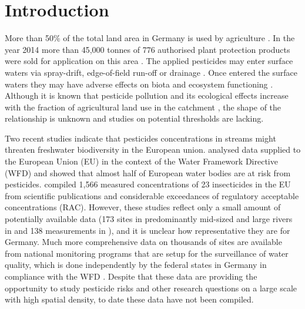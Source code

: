 \documentclass[journal=esthag,manuscript=article]{achemso}
\begin{document}



\section{Introduction}
More than 50\% of the total land area in Germany is used by agriculture \citep{statistisches_bundesamt_bodenflache_2014}.
In the year 2014 more than 45,000 tonnes of 776 authorised plant protection products were sold for application on this area \citep{bundesamt_fur_verbraucherschutz_und_lebensmittelsicherheit_absatz_2015}.
The applied pesticides may enter surface waters via spray-drift, edge-of-field run-off or drainage \citep{stehle_probabilistic_2013,schulz_comparison_2001,liess_determination_1999}.
Once entered the surface waters they may have adverse effects on biota and ecosystem functioning \citep{schafer_thresholds_2012}. 
Although it is known that pesticide pollution and its ecological effects increase with the fraction of agricultural land use in the catchment \citep{schulz_field_2004}, the shape of the relationship is unknown and studies on potential thresholds are lacking.

Two recent studies indicate that pesticides concentrations in streams might threaten freshwater biodiversity in the European union.
\citet{malaj_organic_2014} analysed data supplied to the European Union (EU) in the context of the Water Framework Directive (WFD) and showed that almost half of European water bodies are at risk from pesticides.
\citet{stehle_pesticide_2015} compiled 1,566 measured concentrations of 23 insecticides in the EU from scientific publications and considerable exceedances of regulatory acceptable concentrations (RAC).
However, these studies reflect only a small amount of potentially available data (173 sites in predominantly mid-sized and large rivers in \citet{malaj_organic_2014} and 138 measurements in \citet{stehle_pesticide_2015}), and it is unclear how representative they are for Germany. %
Much more comprehensive data on thousands of sites are available from national monitoring programs that are setup for the surveillance of water quality,
which is done independently by the federal states in Germany in compliance with the WFD \citep{quevauviller_water_2008}. 
Despite that these data are providing the opportunity to study pesticide risks and other research questions on a large scale with high spatial density, to date these data have not been compiled.
\end{document}
